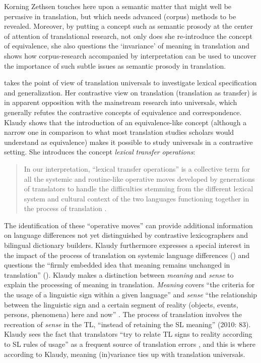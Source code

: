 Korning Zethsen touches here upon a semantic matter that might well be pervasive in translation, but which needs advanced (corpus) methods to be revealed. Moreover, by putting a concept such as semantic prosody at the center of attention of translational research, not only does she re-introduce the concept of equivalence, she also questions the ‘invariance’ of meaning in translation and shows how corpus-research accompanied by interpretation can be used to uncover the importance of such subtle issues as semantic prosody in translation.



\citet{lewandowska-tomasczyk_specification_2010} takes the point of view of translation universals to investigate lexical specification and generalization. Her contrastive view on translation (translation as transfer) is in apparent opposition with the mainstream research into universals, which generally refutes the contrastive concepts of equivalence and correspondence. Klaudy shows that the introduction of an equivalence-like concept (although a narrow one in comparison to what most translation studies scholars would understand as equivalence) makes it possible to study universals in a contrastive setting. She introduces the concept \textit{lexical} \textit{transfer} \textit{operations}:


\begin{quote}
In our interpretation, “lexical transfer operations” is a collective term for all the systemic and routine-like operative moves developed by generations of translators to handle the difficulties stemming from the different lexical system and cultural context of the two languages functioning together in the process of translation \citep[81]{lewandowska-tomasczyk_specification_2010}.
\end{quote}


The identification of these “operative moves” can provide additional information on language differences not yet distinguished by contrastive lexicographers and bilingual dictionary builders. Klaudy furthermore expresses a special interest in the impact of the process of translation on systemic language differences (\citeyear[82]{lewandowska-tomasczyk_specification_2010}) and questions the “firmly embedded idea that meaning remains unchanged in translation” (\citeyear[82]{lewandowska-tomasczyk_specification_2010}). Klaudy makes a distinction between \textit{meaning} and \textit{sense} to explain the processing of meaning in translation. \textit{Meaning} covers “the criteria for the usage of a linguistic sign within a given language” and \textit{sense} “the relationship between the linguistic sign and a certain segment of reality (objects, events, persons, phenomena) here and now” \citep[83]{lewandowska-tomasczyk_specification_2010}. The process of translation involves the recreation of \textit{sense} in the TL, “instead of retaining the SL meaning” (2010: 83). Klaudy sees the fact that translators “try to relate TL signs to reality according to SL rules of usage” as a frequent source of translation errors \citep[83]{lewandowska-tomasczyk_specification_2010}, and this is where according to Klaudy, meaning (in)variance ties up with translation universals.



